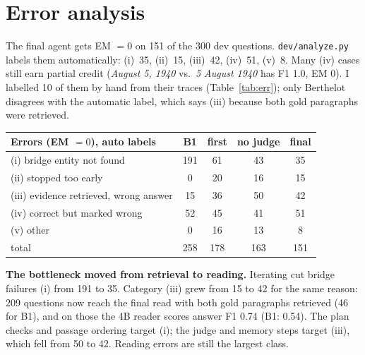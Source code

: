 \documentclass[10pt,a4paper]{article}
\begin{document}
\section{Error analysis}
The final agent gets EM $=0$ on 151 of the 300 dev questions. \texttt{dev/analyze.py} labels them automatically:
(i)~35, (ii)~15, (iii)~42, (iv)~51, (v)~8. Many (iv) cases still earn partial credit (\emph{August 5, 1940} vs.\
\emph{5 August 1940} has F1 1.0, EM 0). I labelled 10 of them by hand from their traces (Table~\ref{tab:err}); only
Berthelot disagrees with the automatic label, which says (iii) because both gold paragraphs were retrieved.

\begin{minipage}[t]{0.47\textwidth}
\vspace{0pt}
\centering\footnotesize
\begin{tabular}{@{}lcccc@{}}
\toprule
Errors (EM $=0$), auto labels & B1 & first & no judge & final\\
\midrule
(i) bridge entity not found & 191 & 61 & 43 & 35\\
(ii) stopped too early & 0 & 20 & 16 & 15\\
(iii) evidence retrieved, wrong answer & 15 & 36 & 50 & 42\\
(iv) correct but marked wrong & 52 & 45 & 41 & 51\\
(v) other & 0 & 16 & 13 & 8\\
\midrule
total & 258 & 178 & 163 & 151\\
\bottomrule
\end{tabular}
\label{tab:cats}
\end{minipage}\hfill
\begin{minipage}[t]{0.505\textwidth}
\vspace{0pt}
\textbf{The bottleneck moved from retrieval to reading.} Iterating cut bridge failures (i) from 191 to 35.
Category (iii) grew from 15 to 42 for the same reason: 209 questions now reach the final read with both gold
paragraphs retrieved (46 for B1), and on those the 4B reader scores answer F1 0.74 (B1: 0.54). The plan checks
and passage ordering target (i); the judge and memory steps target (iii), which fell from 50 to 42. Reading
errors are still the largest class.
\end{minipage}
\end{document}
